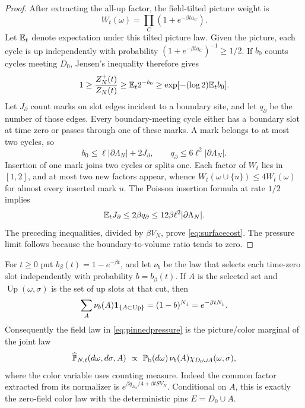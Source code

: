 \begin{proof}
After extracting the all-up factor, the field-tilted picture weight is
\[
 W_t(\omega)=\prod_C(1+e^{-\beta t a_C}).
\]
Let $\mathbb E_t$ denote expectation under this tilted picture law.
Given the picture, each cycle is up independently with probability
$(1+e^{-\beta t a_C})^{-1}\ge1/2$.  If $b_0$ counts cycles meeting
$D_0$, Jensen's inequality therefore gives
\[
 1\ge\frac{Z_N^+(t)}{Z_N(t)}
   \ge\mathbb E_t2^{-b_0}
   \ge\exp[-(\log2)\mathbb E_t b_0].
\]
Let $J_\partial$ count marks on slot edges incident to a boundary
site, and let $q_\partial$ be the number of those edges.
Every boundary-meeting cycle either has a boundary slot at time zero
or passes through one of these marks.  A mark belongs to at most two
cycles, so
\[
 b_0\le\ell|\partial\Lambda_N|+2J_\partial,
 \qquad q_\partial\le6\ell^2|\partial\Lambda_N|.
\]
Insertion of one mark joins two cycles or splits one.  Each factor
of $W_t$ lies in $[1,2]$, and at most two new factors appear, whence
$W_t(\omega\cup\{u\})\le4W_t(\omega)$ for almost every inserted
mark $u$.  The Poisson insertion formula at rate $1/2$ implies
\[
 \mathbb E_t J_\partial\le2\beta q_\partial
               \le12\beta\ell^2|\partial\Lambda_N|.
\]
The preceding inequalities, divided by $\beta V_N$, prove
\eqref{eq:surfacecost}.  The pressure limit follows because the
boundary-to-volume ratio tends to zero.
\end{proof}

For $t\ge0$ put $b_\beta(t)=1-e^{-\beta t}$, and let $\nu_b$
be the law that selects each time-zero slot independently with
probability $b=b_\beta(t)$.  If $A$ is the selected set and
$\operatorname{Up}(\omega,\sigma)$ is the set of up slots at that
cut, then
\begin{equation}\label{eq:fieldpinidentity}
 \sum_A\nu_b(A)\mathbf 1_{\{A\subset\operatorname{Up}\}}
   =(1-b)^{N_\downarrow}=e^{-\beta tN_\downarrow}.
\end{equation}
Consequently the field law in \eqref{eq:pinnedpressure} is the
picture/color marginal of the joint law
\begin{equation}\label{eq:fieldjointlaw}
 \widehat{\mathbb P}_{N,t}(d\omega,d\sigma,A)
  \ \propto\ \mathbb P_{\rm b}(d\omega)\,\nu_b(A)
                         \chi_{D_0\cup A}(\omega,\sigma),
\end{equation}
where the color variable uses counting measure.
Indeed the common factor extracted from its normalizer is
$e^{\beta q_{\Lambda_N}/4+\beta tSV_N}$.
Conditional on $A$, this is exactly the zero-field color law with
the deterministic pins $E=D_0\cup A$.


